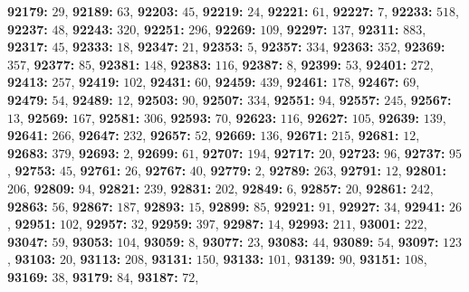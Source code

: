 \textsf{\bfseries 92179:} $29$, \textsf{\bfseries 92189:} $63$, \textsf{\bfseries 92203:} $45$, \textsf{\bfseries 92219:} $24$, \textsf{\bfseries 92221:} $61$, \textsf{\bfseries 92227:} $7$, \textsf{\bfseries 92233:} $518$, \textsf{\bfseries 92237:} $48$, \textsf{\bfseries 92243:} $320$, \textsf{\bfseries 92251:} $296$, \textsf{\bfseries 92269:} $109$, \textsf{\bfseries 92297:} $137$, \textsf{\bfseries 92311:} $883$, \textsf{\bfseries 92317:} $45$, \textsf{\bfseries 92333:} $18$, \textsf{\bfseries 92347:} $21$, \textsf{\bfseries 92353:} $5$, \textsf{\bfseries 92357:} $334$, \textsf{\bfseries 92363:} $352$, \textsf{\bfseries 92369:} $357$, \textsf{\bfseries 92377:} $85$, \textsf{\bfseries 92381:} $148$, \textsf{\bfseries 92383:} $116$, \textsf{\bfseries 92387:} $8$, \textsf{\bfseries 92399:} $53$, \textsf{\bfseries 92401:} $272$, \textsf{\bfseries 92413:} $257$, \textsf{\bfseries 92419:} $102$, \textsf{\bfseries 92431:} $60$, \textsf{\bfseries 92459:} $439$, \textsf{\bfseries 92461:} $178$, \textsf{\bfseries 92467:} $69$, \textsf{\bfseries 92479:} $54$, \textsf{\bfseries 92489:} $12$, \textsf{\bfseries 92503:} $90$, \textsf{\bfseries 92507:} $334$, \textsf{\bfseries 92551:} $94$, \textsf{\bfseries 92557:} $245$, \textsf{\bfseries 92567:} $13$, \textsf{\bfseries 92569:} $167$, \textsf{\bfseries 92581:} $306$, \textsf{\bfseries 92593:} $70$, \textsf{\bfseries 92623:} $116$, \textsf{\bfseries 92627:} $105$, \textsf{\bfseries 92639:} $139$, \textsf{\bfseries 92641:} $266$, \textsf{\bfseries 92647:} $232$, \textsf{\bfseries 92657:} $52$, \textsf{\bfseries 92669:} $136$, \textsf{\bfseries 92671:} $215$, \textsf{\bfseries 92681:} $12$, \textsf{\bfseries 92683:} $379$, \textsf{\bfseries 92693:} $2$, \textsf{\bfseries 92699:} $61$, \textsf{\bfseries 92707:} $194$, \textsf{\bfseries 92717:} $20$, \textsf{\bfseries 92723:} $96$, \textsf{\bfseries 92737:} $95$, \textsf{\bfseries 92753:} $45$, \textsf{\bfseries 92761:} $26$, \textsf{\bfseries 92767:} $40$, \textsf{\bfseries 92779:} $2$, \textsf{\bfseries 92789:} $263$, \textsf{\bfseries 92791:} $12$, \textsf{\bfseries 92801:} $206$, \textsf{\bfseries 92809:} $94$, \textsf{\bfseries 92821:} $239$, \textsf{\bfseries 92831:} $202$, \textsf{\bfseries 92849:} $6$, \textsf{\bfseries 92857:} $20$, \textsf{\bfseries 92861:} $242$, \textsf{\bfseries 92863:} $56$, \textsf{\bfseries 92867:} $187$, \textsf{\bfseries 92893:} $15$, \textsf{\bfseries 92899:} $85$, \textsf{\bfseries 92921:} $91$, \textsf{\bfseries 92927:} $34$, \textsf{\bfseries 92941:} $26$, \textsf{\bfseries 92951:} $102$, \textsf{\bfseries 92957:} $32$, \textsf{\bfseries 92959:} $397$, \textsf{\bfseries 92987:} $14$, \textsf{\bfseries 92993:} $211$, \textsf{\bfseries 93001:} $222$, \textsf{\bfseries 93047:} $59$, \textsf{\bfseries 93053:} $104$, \textsf{\bfseries 93059:} $8$, \textsf{\bfseries 93077:} $23$, \textsf{\bfseries 93083:} $44$, \textsf{\bfseries 93089:} $54$, \textsf{\bfseries 93097:} $123$, \textsf{\bfseries 93103:} $20$, \textsf{\bfseries 93113:} $208$, \textsf{\bfseries 93131:} $150$, \textsf{\bfseries 93133:} $101$, \textsf{\bfseries 93139:} $90$, \textsf{\bfseries 93151:} $108$, \textsf{\bfseries 93169:} $38$, \textsf{\bfseries 93179:} $84$, \textsf{\bfseries 93187:} $72$, 
